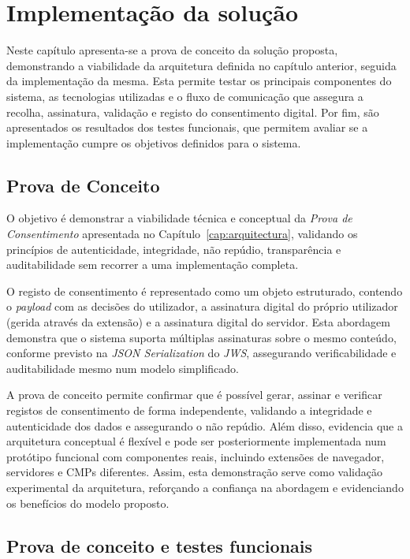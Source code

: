 \chapter{Implementação da solução}
\label{cap:implementacao}

Neste capítulo apresenta-se a prova de conceito da solução proposta, demonstrando a viabilidade da arquitetura definida no capítulo anterior, seguida da implementação da mesma. Esta permite testar os principais componentes do sistema, as tecnologias utilizadas e o fluxo de comunicação que assegura a recolha, assinatura, validação e registo do consentimento digital. Por fim, são apresentados os resultados dos testes funcionais, que permitem avaliar se a implementação cumpre os objetivos definidos para o sistema.

\section{Prova de Conceito}

O objetivo é demonstrar a viabilidade técnica e conceptual da \textit{Prova de Consentimento} apresentada no Capítulo~\ref{cap:arquitectura}, validando os princípios de autenticidade, integridade, não repúdio, transparência e auditabilidade sem recorrer a uma implementação completa.

O registo de consentimento é representado como um objeto estruturado, contendo o \textit{payload} com as decisões do utilizador, a assinatura digital do próprio utilizador (gerida através da extensão) e a assinatura digital do servidor. Esta abordagem demonstra que o sistema suporta múltiplas assinaturas sobre o mesmo conteúdo, conforme previsto na \textit{JSON Serialization} do \textit{JWS}, assegurando verificabilidade e auditabilidade mesmo num modelo simplificado.

A prova de conceito permite confirmar que é possível gerar, assinar e verificar registos de consentimento de forma independente, validando a integridade e autenticidade dos dados e assegurando o não repúdio. Além disso, evidencia que a arquitetura conceptual é flexível e pode ser posteriormente implementada num protótipo funcional com componentes reais, incluindo extensões de navegador, servidores e CMPs diferentes. Assim, esta demonstração serve como validação experimental da arquitetura, reforçando a confiança na abordagem e evidenciando os benefícios do modelo proposto.

\section{Prova de conceito e testes funcionais}

